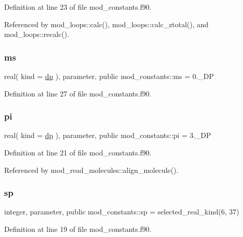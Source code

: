 Definition at line 23 of file mod\+\_\+constants.\+f90.



Referenced by mod\+\_\+loops\+::calc(), mod\+\_\+loops\+::calc\+\_\+ztotal(), and mod\+\_\+loops\+::recalc().

\mbox{\label{namespacemod__constants_ab31d074fb8a49a9991d7d6e3d4904d59}} 
\subsubsection{\texorpdfstring{ms}{ms}}
{\footnotesize\ttfamily real( kind = \hyperlink{namespacemod__constants_ac7aeda7f1802c4ef2a4780773c028214}{dp} ), parameter, public mod\+\_\+constants\+::ms = 0.\+\_\+\+DP}



Definition at line 27 of file mod\+\_\+constants.\+f90.

\mbox{\label{namespacemod__constants_a04c6845722711f5522458ed34969cdc3}} 
\subsubsection{\texorpdfstring{pi}{pi}}
{\footnotesize\ttfamily real( kind = \hyperlink{namespacemod__constants_ac7aeda7f1802c4ef2a4780773c028214}{dp} ), parameter, public mod\+\_\+constants\+::pi = 3.\+\_\+\+DP}



Definition at line 21 of file mod\+\_\+constants.\+f90.



Referenced by mod\+\_\+read\+\_\+molecules\+::align\+\_\+molecule().

\mbox{\label{namespacemod__constants_af0d7aefb6fb852492ee0db77744a412d}} 
\subsubsection{\texorpdfstring{sp}{sp}}
{\footnotesize\ttfamily integer, parameter, public mod\+\_\+constants\+::sp = selected\+\_\+real\+\_\+kind(6, 37)}



Definition at line 19 of file mod\+\_\+constants.\+f90.

